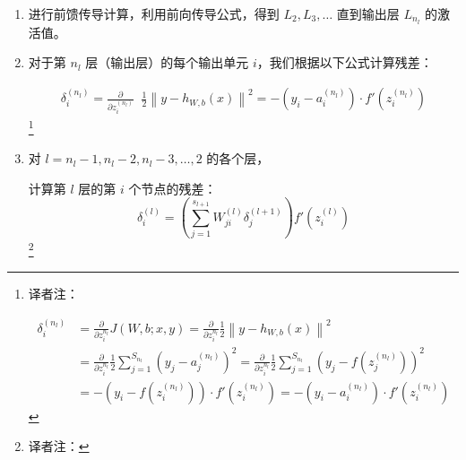\begin{enumerate}
  \item
{}
    {进行前馈传导计算，利用前向传导公式，得到 $L_2, L_3, \ldots$ 直到输出层 $L_{n_l}$ 的激活值。}
    {}

  \item
{}
    {对于第 $n_l$ 层（输出层）的每个输出单元 $i$，我们根据以下公式计算残差：}
    {}

\begin{align}
\delta^{(n_l)}_i
= \frac{\partial}{\partial z^{(n_l)}_i} \;\;
        \frac{1}{2} \left\|y - h_{W,b}(x)\right\|^2 = - (y_i - a^{(n_l)}_i) \cdot f'(z^{(n_l)}_i)
\end{align}
\footnote{译者注：

\begin{align}
\delta^{(n_l)}_i &= \frac{\partial}{\partial z^{n_l}_i}J(W,b;x,y)
 = \frac{\partial}{\partial z^{n_l}_i}\frac{1}{2} \left\|y - h_{W,b}(x)\right\|^2 \\
 &= \frac{\partial}{\partial z^{n_l}_i}\frac{1}{2} \sum_{j=1}^{S_{n_l}} (y_j-a_j^{(n_l)})^2
 = \frac{\partial}{\partial z^{n_l}_i}\frac{1}{2} \sum_{j=1}^{S_{n_l}} (y_j-f(z_j^{(n_l)}))^2 \\
 &= - (y_i - f(z_i^{(n_l)})) \cdot f'(z^{(n_l)}_i)
 = - (y_i - a^{(n_l)}_i) \cdot f'(z^{(n_l)}_i)
\end{align}
}

  \item
{}
    {对 $l = n_l-1, n_l-2, n_l-3, \ldots, 2$ 的各个层，}
    {}

    {计算第 $l$ 层的第 $i$ 个节点的残差：}
    {}
$$
\delta^{(l)}_i = \left( \sum_{j=1}^{s_{l+1}} W^{(l)}_{ji} \delta^{(l+1)}_j \right) f'(z^{(l)}_i)
$$
\footnote{译者注：
 
}
\end{enumerate}
